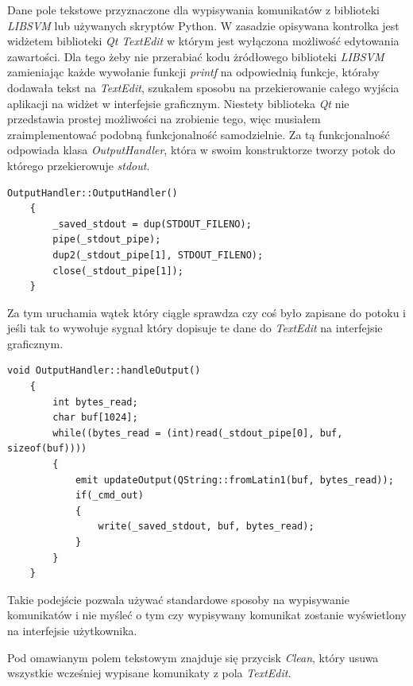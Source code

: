 \documentclass[paper=a4, fontsize=11pt]{scrartcl} %
\numberwithin{equation}{section} %
\numberwithin{figure}{section} %
\begin{document}
    \par Dane pole tekstowe przyznaczone dla wypisywania komunikatów z biblioteki
    \textit{LIBSVM} lub używanych skryptów Python. W zasadzie opisywana kontrolka jest
    widżetem biblioteki \textit{Qt} \textit{TextEdit} w którym jest wyłączona możliwość
    edytowania zawartości. Dla tego żeby nie przerabiać kodu żródłowego biblioteki
    \textit{LIBSVM} zamieniając każde wywołanie funkcji \textit{printf} na odpowiednią funkcje,
    któraby dodawała tekst na \textit{TextEdit}, szukałem sposobu na przekierowanie całego
    wyjścia aplikacji na widżet w interfejsie graficznym. Niestety biblioteka \textit{Qt} nie
    przedstawia prostej możliwości na zrobienie tego, więc musiałem zraimplementować podobną
    funkcjonalność samodzielnie. Za tą funkcjonalność odpowiada klasa \textit{OutputHandler},
    która w swoim konstruktorze tworzy potok do którego przekierowuje \textit{stdout}.

    \begin{lstlisting}[caption={Konstruktor klasy \textit{OutputHandler}},captionpos=b]
    OutputHandler::OutputHandler()
    {
        _saved_stdout = dup(STDOUT_FILENO);
        pipe(_stdout_pipe);
        dup2(_stdout_pipe[1], STDOUT_FILENO);
        close(_stdout_pipe[1]);
    }
    \end{lstlisting}

    \par Za tym uruchamia wątek który ciągle sprawdza czy coś było zapisane do potoku i jeśli
    tak to wywołuje sygnał który dopisuje te dane do \textit{TextEdit} na interfejsie graficznym.

    \newpage
    \begin{lstlisting}[caption={Funkcja uruchamiana w wątku},captionpos=b]
    void OutputHandler::handleOutput()
    {
        int bytes_read;
        char buf[1024];
        while((bytes_read = (int)read(_stdout_pipe[0], buf, sizeof(buf))))
        {
            emit updateOutput(QString::fromLatin1(buf, bytes_read));
            if(_cmd_out)
            {
                write(_saved_stdout, buf, bytes_read);
            }
        }
    }
    \end{lstlisting}

    \par Takie podejście pozwala używać standardowe sposoby na wypisywanie komunikatów i nie
    myśleć o tym czy wypisywany komunikat zostanie wyświetlony na interfejsie użytkownika.
    \par Pod omawianym polem tekstowym znajduje się przycisk \textit{Clean}, który usuwa
    wszystkie wcześniej wypisane komunikaty z pola \textit{TextEdit}. 
\end{document}
